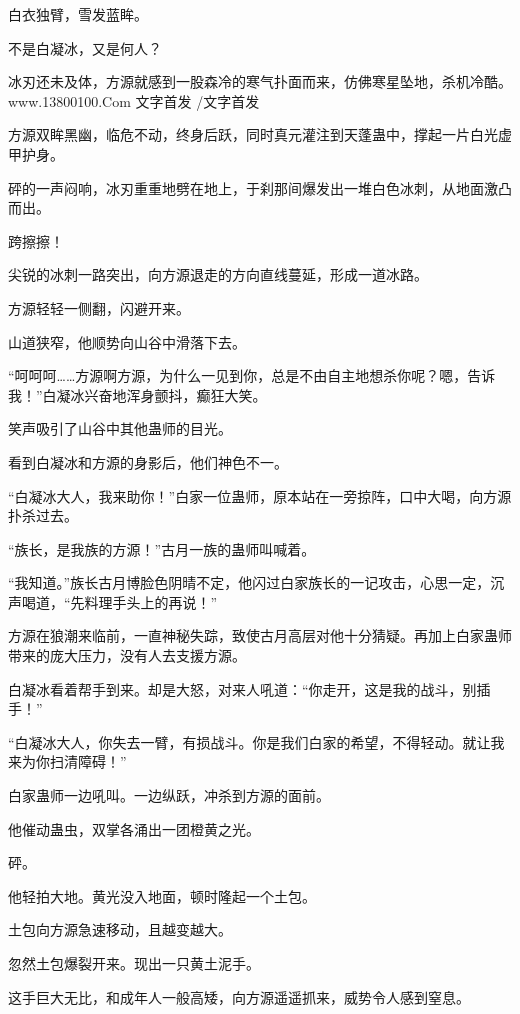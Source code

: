
\begin{this_body}

白衣独臂，雪发蓝眸。

不是白凝冰，又是何人？

冰刃还未及体，方源就感到一股森冷的寒气扑面而来，仿佛寒星坠地，杀机冷酷。www.13800100.Com 文字首发 /文字首发

方源双眸黑幽，临危不动，终身后跃，同时真元灌注到天蓬蛊中，撑起一片白光虚甲护身。

砰的一声闷响，冰刃重重地劈在地上，于刹那间爆发出一堆白色冰刺，从地面激凸而出。

跨擦擦！

尖锐的冰刺一路突出，向方源退走的方向直线蔓延，形成一道冰路。

方源轻轻一侧翻，闪避开来。

山道狭窄，他顺势向山谷中滑落下去。

“呵呵呵……方源啊方源，为什么一见到你，总是不由自主地想杀你呢？嗯，告诉我！”白凝冰兴奋地浑身颤抖，癫狂大笑。

笑声吸引了山谷中其他蛊师的目光。

看到白凝冰和方源的身影后，他们神色不一。

“白凝冰大人，我来助你！”白家一位蛊师，原本站在一旁掠阵，口中大喝，向方源扑杀过去。

“族长，是我族的方源！”古月一族的蛊师叫喊着。

“我知道。”族长古月博脸色阴晴不定，他闪过白家族长的一记攻击，心思一定，沉声喝道，“先料理手头上的再说！”

方源在狼潮来临前，一直神秘失踪，致使古月高层对他十分猜疑。再加上白家蛊师带来的庞大压力，没有人去支援方源。

白凝冰看着帮手到来。却是大怒，对来人吼道：“你走开，这是我的战斗，别插手！”

“白凝冰大人，你失去一臂，有损战斗。你是我们白家的希望，不得轻动。就让我来为你扫清障碍！”

白家蛊师一边吼叫。一边纵跃，冲杀到方源的面前。

他催动蛊虫，双掌各涌出一团橙黄之光。

砰。

他轻拍大地。黄光没入地面，顿时隆起一个土包。

土包向方源急速移动，且越变越大。

忽然土包爆裂开来。现出一只黄土泥手。

这手巨大无比，和成年人一般高矮，向方源遥遥抓来，威势令人感到窒息。


\end{this_body}
